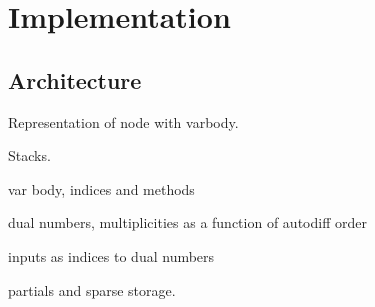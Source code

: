 \chapter{Implementation}

\section{Architecture}

Representation of node with varbody.

Stacks.

var body, indices and methods

dual numbers, multiplicities as a function of autodiff order

inputs as indices to dual numbers

partials and sparse storage.